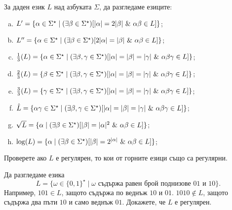 \begin{problem}
  За даден език $L$ над азбуката $\Sigma$, да разгледаме езиците:
  \begin{enumerate}[a)]
  \item
    $L' = \{\alpha \in \Sigma^\star \mid (\exists \beta\in\Sigma^\star)[\abs{\alpha} = 2\abs{\beta}\ \&\ \alpha\beta \in L]\}$;
  \item 
    $L'' = \{\alpha \in \Sigma^\star \mid (\exists \beta\in\Sigma^\star)[2\abs{\alpha} = \abs{\beta}\ \&\ \alpha\beta \in L]\}$;
  \item 
    $\frac{1}{3}(L) = \{\alpha \in \Sigma^\star \mid (\exists \beta,\gamma \in \Sigma^\star)[\vert{\alpha}\vert = \vert{\beta}\vert = \vert{\gamma}\vert\ \&\ \alpha\beta\gamma \in L]\}$;
  \item
    $\frac{2}{3}(L) = \{\beta \in \Sigma^\star \mid (\exists \beta,\gamma \in \Sigma^\star)[\vert{\alpha}\vert = \vert{\beta}\vert = \vert{\gamma}\vert\ \&\ \alpha\beta\gamma \in L]\}$;
  \item
    $\frac{3}{3}(L) = \{\gamma \in \Sigma^\star \mid (\exists \beta,\gamma \in \Sigma^\star)[\vert{\alpha}\vert = \vert{\beta}\vert = \vert{\gamma}\vert\ \&\ \alpha\beta\gamma \in L]\}$;
  \item
    $\hat{L} = \{\alpha\gamma \in \Sigma^\star \mid (\exists \beta,\gamma \in \Sigma^\star)[\vert{\alpha}\vert = \vert{\beta}\vert = \vert{\gamma}\vert\ \&\ \alpha\beta\gamma \in L]\}$;
  \item
    $\sqrt{L} = \{\alpha \mid (\exists \beta \in \Sigma^\star)[\abs{\beta} = \abs{\alpha}^2\ \&\ \alpha\beta \in L]\}$;
  \item
    $\log(L) = \{\alpha \mid (\exists \beta \in \Sigma^\star)[\vert{\beta}\vert = 2^{\vert{\alpha}\vert}\ \&\ \alpha\beta \in L]\}$;
  \end{enumerate}
  Проверете ако $L$ е регулярен, то кои от горните езици също са регулярни.
\end{problem}

\begin{problem}
  Да разгледаме езика
  \[L = \{\omega \in \{0,1\}^\star \mid \omega\text{ съдържа равен брой поднизове }01\text{ и }10\}.\]
  Например, $101 \in L$, защото съдържа по веднъж $10$ и $01$.
  $1010 \not\in  L$, защото съдържа два пъти $10$ и само веднъж $01$.
  Докажете, че $L$ е регулярен.
\end{problem}

